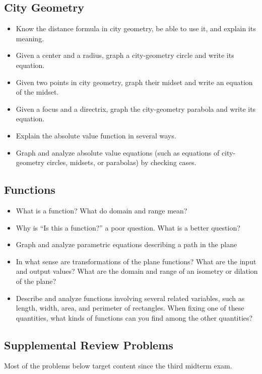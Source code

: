 \subsection*{City Geometry}
\begin{itemize}\itemsep-3pt
\item Know the distance formula in city geometry, be able to use it, and explain its meaning. 
\item Given a center and a radius, graph a city-geometry circle and write its equation.  
\item Given two points in city geometry,  graph their midset and write an equation of the midset.  
\item Given a focus and a directrix, graph the city-geometry parabola and write its equation.  
\item Explain the absolute value function in several ways.
\item Graph and analyze absolute value equations (such as equations of city-geometry circles, midsets, or parabolas) by checking cases.  
\end{itemize}

\subsection*{Functions}
\begin{itemize}\itemsep-3pt
\item What is a function?  What do domain and range mean?  
\item Why is ``Is this a function?'' a poor question.  What is a better question?  
\item Graph and analyze parametric equations describing a path in the plane
\item In what sense are transformations of the plane functions?  What are the input and output values?  What are the domain and range of an isometry or dilation of the plane?  
\item Describe and analyze functions involving several related variables, such as length, width, area, and perimeter of rectangles.   When fixing one of these quantities, what kinds of functions can you find among the other quantities? 
\end{itemize}



\subsection{Supplemental Review Problems}
Most of the problems below target content since the third midterm exam. 



